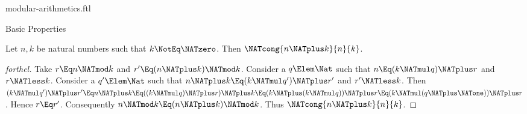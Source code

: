 \documentclass{stex}
\begin{document}
\begin{smodule}{modular-arithmetics.ftl}
\begin{sfragment}{Basic Properties}
  
  \begin{proposition}[forthel,name=congruency of sum]
    Let $n, k$ be natural numbers such that $k \NotEq \NATzero$.
    Then $\NATcong{n \NATplus k}{n}{k}$.
  \end{proposition}
  \begin{proof}[forthel]
    Take $r \Eq n \NATmod k$ and $r' \Eq (n \NATplus k) \NATmod k$.
    Consider a $q \Elem \Nat$ such that $n \Eq (k \NATmul q) \NATplus r$ and $r \NATless k$.
    Consider a $q' \Elem \Nat$ such that $n \NATplus k \Eq (k \NATmul q') \NATplus r'$ and
    $r' \NATless k$.
    Then $(k \NATmul q') \NATplus r'
      \Eq n \NATplus k
      \Eq ((k \NATmul q) \NATplus r) \NATplus k
      \Eq (k \NATplus (k \NATmul q)) \NATplus r
      \Eq (k \NATmul (q \NATplus \NATone)) \NATplus r$.
    Hence $r \Eq r'$.
    Consequently $n \NATmod k \Eq (n \NATplus k) \NATmod k$.
    Thus $\NATcong{n \NATplus k}{n}{k}$.
  \end{proof}
\end{sfragment}
\end{smodule}
\end{document}
